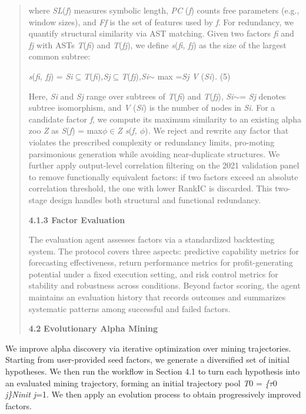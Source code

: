 \documentclass[
]{article}
\begin{document}
\begin{quote}
where \emph{SL}(\emph{f}) measures symbolic length, \emph{PC} (\emph{f})
counts free parameters (e.g., window sizes), and \emph{Ff} is the set of
features used by \emph{f}. For redundancy, we quantify structural
similarity via AST matching. Given two factors \emph{fi} and \emph{fj}
with ASTs \emph{T}(\emph{fi}) and \emph{T}(\emph{fj}), we define
\emph{s}(\emph{fi, fj}) as the size of the largest common subtree:

\emph{s}(\emph{fi, fj}) =
\emph{Si$\subseteq$T}(\emph{fi})\emph{,Sj$\subseteq$T}(\emph{fj})\emph{,Si$\sim$} max =\emph{Sj
\textbar V} (\emph{Si})\emph{\textbar.} (5)

Here, \emph{Si} and \emph{Sj} range over subtrees of \emph{T}(\emph{fi})
and \emph{T}(\emph{fj}), \emph{Si$\sim$}= \emph{Sj} denotes subtree
isomorphism, and \emph{\textbar V} (\emph{Si})\emph{\textbar{}} is the
number of nodes in \emph{Si}. For a candidate factor \emph{f}, we
compute its maximum similarity to an existing alpha zoo \emph{Z} as
\emph{S}(\emph{f}) = max\emph{$\phi$$\in$Z s}(\emph{f, $\phi$})\emph{.} We reject and
rewrite any factor that violates the prescribed complexity or redundancy
limits, pro-moting parsimonious generation while avoiding near-duplicate
structures. We further apply output-level correlation filtering on the
2021 validation panel to remove functionally equivalent factors: if two
factors exceed an absolute correlation threshold, the one with lower
RankIC is discarded. This two-stage design handles both structural and
functional redundancy.

\textbf{4.1.3 Factor Evaluation}

The evaluation agent assesses factors via a standardized backtesting
system. The protocol covers three aspects: predictive capability metrics
for forecasting effectiveness, return performance metrics for
profit-generating potential under a fixed execution setting, and risk
control metrics for stability and robustness across conditions. Beyond
factor scoring, the agent maintains an evaluation history that records
outcomes and summarizes systematic patterns among successful and failed
factors.

\textbf{4.2} \textbf{Evolutionary Alpha Mining}
\end{quote}

We improve alpha discovery via iterative optimization over mining
trajectories. Starting from user-provided seed factors, we generate a
diversified set of initial hypotheses. We then run the workflow in
Section 4.1 to turn each hypothesis into an evaluated mining trajectory,
forming an initial trajectory pool \emph{T}0 = \emph{\{$\tau$}0
\emph{j\}Ninit j}=1. We then apply an evolution process to obtain
progressively improved factors.
\end{document}
